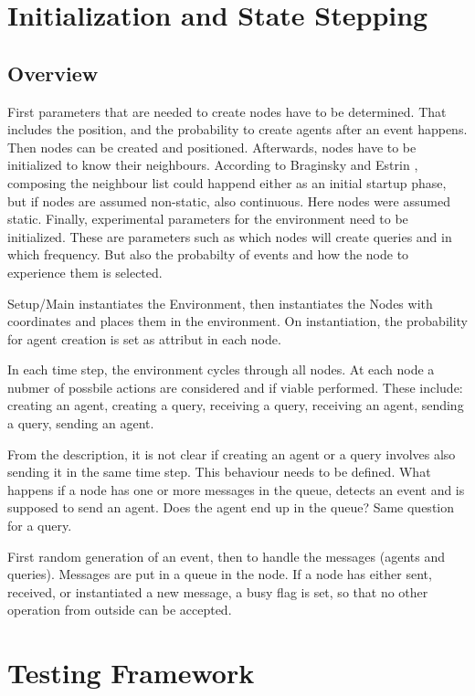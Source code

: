 \documentclass[a4paper,11pt,twoside]{article}
\begin{document}
\section{Initialization and State Stepping}
\subsection{Overview}
First parameters that are needed to create nodes have to be determined.
That includes the position, and the probability to create agents after
an event happens. Then nodes can be created and
positioned. Afterwards, nodes have to be initialized to know their
neighbours. According to Braginsky and Estrin \cite{braginsky2002},
composing the neighbour list could happend either as an initial
startup phase, but if nodes are assumed non-static, also
continuous. Here nodes were assumed static. Finally, experimental
parameters for the environment need to be initialized. These are
parameters such as which nodes will create queries and in which
frequency. But also the probabilty of events and how the node to
experience them is selected. 

Setup/Main instantiates the Environment, then instantiates the Nodes
with coordinates and places them in the environment. On
instantiation, the probability for agent creation is set as attribut
in each node.

In each time step, the environment cycles through all
nodes. At each node a nubmer of possbile actions are considered and if
viable performed. These include: creating an agent, creating a query,
receiving a query, receiving an agent, sending a query, sending an
agent.

From the description, it is not clear if creating an agent or a query
involves also sending it in the same time step. This behaviour needs
to be defined. What happens if a node has one or more messages in the
queue, detects an event and is supposed to send an agent. Does the
agent end up in the queue? Same question for a query.

First random generation of an event, then to handle the messages
(agents and queries). Messages are put in a queue in the node. If
a node has either sent, received, or instantiated a new message, a
busy flag is set, so that no other operation from outside
can be accepted.   








\section{Testing Framework}



\end{document}
